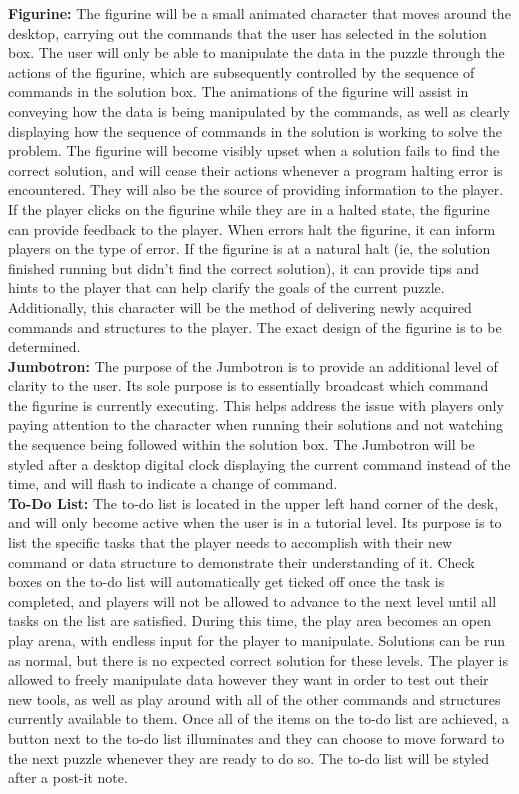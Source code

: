 \textbf{Figurine:}
The figurine will be a small animated character that moves around the desktop, carrying out the commands that 
the user has selected in the solution box. The user will only be able to manipulate the data in the puzzle through 
the actions of the figurine, which are subsequently controlled by the sequence of commands in the solution box. 
The animations of the figurine will assist in conveying how the data is being manipulated by the commands, as 
well as clearly displaying how the sequence of commands in the solution is working to solve the problem. The 
figurine will become visibly upset when a solution fails to find the correct solution, and will cease their actions 
whenever a program halting error is encountered. They will also be the source of providing information to the 
player. If the player clicks on the figurine while they are in a halted state, the figurine can provide feedback to 
the player. When errors halt the figurine, it can inform players on the type of error. If the figurine is at a natural 
halt (ie, the solution finished running but didn’t find the correct solution), it can provide tips and hints to the 
player that can help clarify the goals of the current puzzle. Additionally, this character will be the method of 
delivering newly acquired commands and structures to the player. The exact design of the figurine is to be 
determined.\\

\textbf{Jumbotron:}
The purpose of the Jumbotron is to provide an additional level of clarity to the user. Its sole purpose is to 
essentially broadcast which command the figurine is currently executing. This helps address the issue with 
players only paying attention to the character when running their solutions and not watching the sequence 
being followed within the solution box. The Jumbotron will be styled after a desktop digital clock displaying 
the current command instead of the time, and will flash to indicate a change of command.\\

\textbf{To-Do List:}
The to-do list is located in the upper left hand corner of the desk, and will only become active when the user 
is in a tutorial level. Its purpose is to list the specific tasks that the player needs to accomplish with their new 
command or data structure to demonstrate their understanding of it. Check boxes on the to-do list will automatically 
get ticked off once the task is completed, and players will not be allowed to advance to the next level until all 
tasks on the list are satisfied. During this time, the play area becomes an open play arena, with endless input for 
the player to manipulate. Solutions can be run as normal, but there is no expected correct solution for these levels. 
The player is allowed to freely manipulate data however they want in order to test out their new tools, as well as play 
around with all of the other commands and structures currently available to them. Once all of the items on the to-do 
list are achieved, a button next to the to-do list illuminates and they can choose to move forward to the next puzzle 
whenever they are ready to do so. The to-do list will be styled after a post-it note.\\

